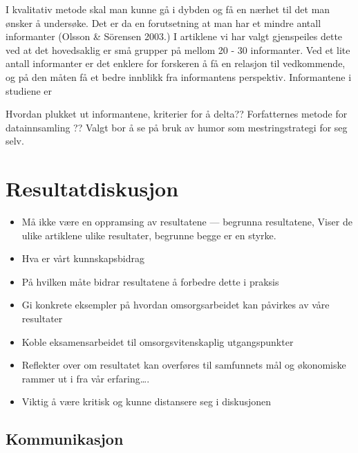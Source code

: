 I kvalitativ metode skal man kunne gå i dybden og få en nærhet til det man
ønsker å undersøke. Det er da en forutsetning at man har et mindre antall
informanter (Olsson \&{} Sörensen 2003.) I artiklene vi har valgt gjenspeiles
dette ved at  det  hovedsaklig er små grupper på mellom 20 - 30 informanter.
Ved et lite antall informanter er det enklere for forskeren å få en relasjon
til vedkommende, og på den måten få et bedre innblikk fra informantens
perspektiv. Informantene i studiene er

Hvordan plukket ut informantene, kriterier for å delta??  Forfatternes metode
for datainnsamling ??  Valgt bor å se på bruk av humor som mestringstrategi for
seg selv.

\section{Resultatdiskusjon}


\begin{itemize}
\item Må ikke være en oppramsing av resultatene --- begrunna resultatene, Viser
  de ulike artiklene ulike resultater, begrunne begge er en styrke.

\item Hva er vårt kunnskapsbidrag

\item På hvilken måte bidrar resultatene å forbedre dette i praksis

\item Gi konkrete eksempler på hvordan omsorgsarbeidet kan påvirkes av våre
  resultater

\item Koble eksamensarbeidet til omsorgsvitenskaplig utgangspunkter

\item Reflekter over om resultatet kan overføres til samfunnets mål og
  økonomiske rammer ut i fra vår erfaring….

\item Viktig å være kritisk og kunne distansere seg i diskusjonen
\end{itemize}


\subsection{Kommunikasjon}

